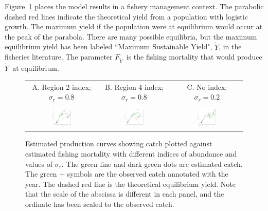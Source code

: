 \documentclass[12pt,letterpaper]{article}
\newcommand\MSY{\widetilde{Y}}
\newcommand\Fmsy{F_{\MSY}}
\begin{document}
Figure~\ref{fig:estprod} places the model results in a fishery
management context. The parabolic dashed red lines indicate the theoretical
yield from a population with logistic growth. The maximum yield if the
population were at equilibrium would occur at the  peak of the parabola.
There are many possible equilibria, but the  maximum equilibrium yield
has been labeled ``Maximum Sustainable Yield", $\MSY$, in the fisheries
literature.
The parameter $\Fmsy$\ is the fishing mortality that would produce $\MSY$\
at equilibrium. 


\begin{figure}
\begin{center}
{\scriptsize \sffamily
\begin{tabular}{ccc}
A. Region 2 index; $\sigma_r=0.8$ &
B. Region 4 index; $\sigma_r=0.8$ &
C. No index; $\sigma_r=0.2$ \\
\\
\includegraphics[width=0.30\textwidth]{./4-gear-runs_r2_prodB1.pdf} &
\includegraphics[width=0.30\textwidth]{./4-gear-runs_r4_prodB1.pdf} &
\includegraphics[width=0.30\textwidth]{./4-gear-runs_r0-sdrprior_prodB1.pdf}\\
\end{tabular}
}
\caption{Estimated production curves showing catch plotted against
estimated fishing mortality with different indices of abundance
and values of $\sigma_r$.
The green line and dark green dots are estimated catch.
The green $+$ symbols are the observed catch annotated with the year.
The dashed red line is the theoretical equilibrium yield.
Note that the scale of the abscissa is different in each panel, and
the ordinate has been scaled to the observed catch.
\label{fig:estprod}}
\end{center}
\end{figure}
\end{document}
